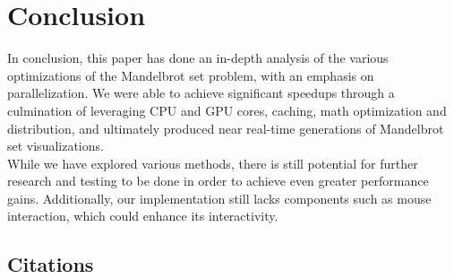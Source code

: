 \documentclass{article}
\begin{document}
\section{Conclusion}

In conclusion, this paper has done an in-depth analysis of the various optimizations of the Mandelbrot set problem, with an emphasis on parallelization.
We were able to achieve significant speedups through a culmination of leveraging CPU and GPU cores, caching, math optimization and distribution, and ultimately produced near real-time generations of Mandelbrot set visualizations.\\

While we have explored various methods, there is still potential for further research and testing to be done in order to achieve even greater performance gains.
Additionally, our implementation still lacks components such as mouse interaction, which could enhance its interactivity.

\pagebreak

\begin{center}

\section*{Citations}

\end{center}
\end{document}
